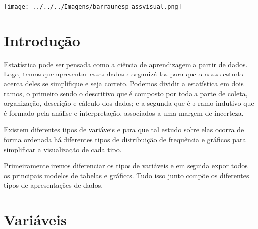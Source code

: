 \documentclass[
	12pt,				%
	oneside,			%
	a4paper,			%
	english,			%
	french,				%
	spanish,			%
	brazil,				%
	]{abntex2}
\begin{document}
\begin{minipage}[c][1.5cm][c]{3cm} %

\texttt{[image: ../../../Imagens/barraunesp-assvisual.png]} 

\end{minipage}


\frenchspacing 


\imprimircapa

\imprimirfolhaderosto*

\tableofcontents*
\newpage

\section[Introdução]{Introdução}
\pagestyle{fancy}

Estatística pode ser pensada como a ciência de aprendizagem a partir de dados. Logo, temos que apresentar esses dados e organizá-los para que o nosso estudo acerca deles se simplifique e seja correto. Podemos dividir a estatística em dois ramos, o primeiro sendo o descritivo que é composto por toda a parte de coleta, organização, descrição e cálculo dos dados; e a segunda que é o ramo indutivo que é formado pela análise e interpretação, associados a uma margem de incerteza. \cite{wiki}

Existem diferentes tipos de variáveis e para que tal estudo sobre elas ocorra de forma ordenada há diferentes tipos de distribuição de frequência e gráficos para simplificar a visualização de cada tipo.

Primeiramente iremos diferenciar os tipos de variáveis e em seguida expor todos os principais modelos de tabelas e gráficos. Tudo isso junto compõe os diferentes tipos de apresentações de dados.

\newpage
\section[Variáveis]{Variáveis}
\end{document}
